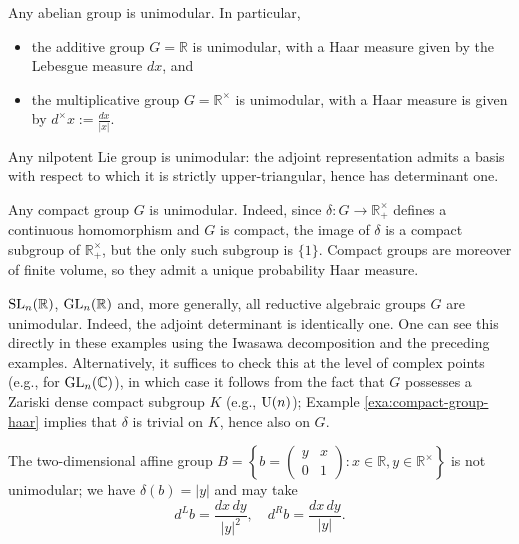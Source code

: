 \documentclass[reqno]{amsart} 
\begin{document}
\begin{example}
  Any abelian group is unimodular.  In particular,
  \begin{itemize}
  \item the additive group $G = \mathbb{R}$ is unimodular, with a Haar measure given by the Lebesgue measure $d x$, and
  \item the multiplicative group $G = \mathbb{R}^\times$ is unimodular, with a Haar measure is given by $d^\times x := \frac{d x}{|x|}$.
  \end{itemize}
\end{example}
\begin{example}
  Any nilpotent Lie group is unimodular: the adjoint representation admits a basis with respect to which it is strictly upper-triangular, hence has determinant one.
\end{example}
\begin{example}\label{exa:compact-group-haar}
  Any compact group $G$ is unimodular.  Indeed, since $\delta : G \rightarrow \mathbb{R}^\times_+$ defines a continuous homomorphism and $G$ is compact, the image of $\delta$ is a compact subgroup of $\mathbb{R}^\times_+$, but the only such subgroup is $\{1\}$.  Compact groups are moreover of finite volume, so they admit a unique probability Haar measure.
\end{example}
\begin{example}
  $\operatorname{SL}_n(\mathbb{R})$, $\operatorname{GL}_n(\mathbb{R})$ and, more generally, all reductive algebraic groups $G$ are unimodular.  Indeed, the adjoint determinant is identically one.  One can see this directly in these examples using the Iwasawa decomposition and the preceding examples.  Alternatively, it suffices to check this at the level of complex points (e.g., for $\operatorname{GL}_n(\mathbb{C})$), in which case it follows from the fact that $G$ possesses a Zariski dense compact subgroup $K$ (e.g., $\operatorname{U}(n)$); Example \ref{exa:compact-group-haar} implies that $\delta$ is trivial on $K$, hence also on $G$.
\end{example}
\begin{example}
  The two-dimensional affine group $B = \left\{ b =
    \begin{pmatrix}
      y & x \\
      0 & 1
    \end{pmatrix}
    : x \in \mathbb{R}, y \in \mathbb{R}^\times \right\}$ is not unimodular; we have $\delta(b) = |y|$ and may take
  \begin{equation*}
    d^L b = \frac{d x \, d y}{|y|^2}, \quad d^R b = \frac{d x \, d y}{|y|}.
  \end{equation*}
\end{example}
\end{document}

